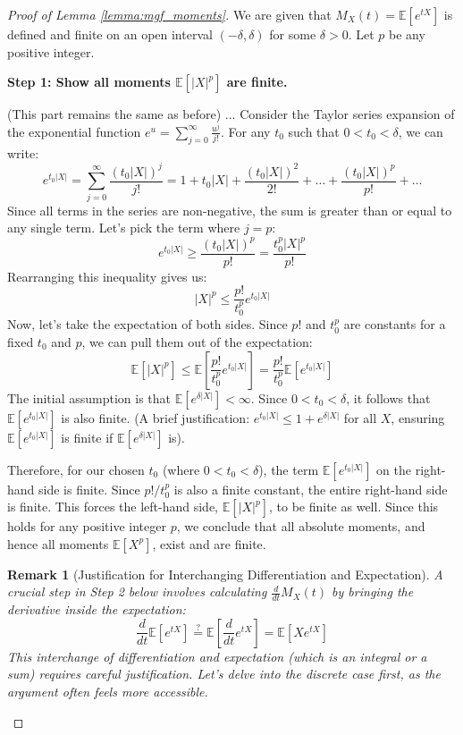 \documentclass[12pt]{article}
\newtheorem{remark}[theorem]{Remark}
\begin{document}
\begin{proof}[Proof of Lemma \ref{lemma:mgf_moments}]
We are given that $M_X(t) = \mathbb{E}[e^{tX}]$ is defined and finite on an open interval $(-\delta, \delta)$ for some $\delta > 0$. Let $p$ be any positive integer.

\textbf{Step 1: Show all moments $\mathbb{E}[|X|^p]$ are finite.}

(This part remains the same as before) ... Consider the Taylor series expansion of the exponential function $e^u = \sum_{j=0}^{\infty} \frac{u^j}{j!}$. For any $t_0$ such that $0 < t_0 < \delta$, we can write:
\[
e^{t_0|X|} = \sum_{j=0}^{\infty} \frac{(t_0|X|)^j}{j!} = 1 + t_0|X| + \frac{(t_0|X|)^2}{2!} + \dots + \frac{(t_0|X|)^p}{p!} + \dots
\]
Since all terms in the series are non-negative, the sum is greater than or equal to any single term. Let's pick the term where $j=p$:
\[
e^{t_0|X|} \ge \frac{(t_0|X|)^p}{p!} = \frac{t_0^p |X|^p}{p!}
\]
Rearranging this inequality gives us:
\[
|X|^p \le \frac{p!}{t_0^p} e^{t_0|X|}
\]
Now, let's take the expectation of both sides. Since $p!$ and $t_0^p$ are constants for a fixed $t_0$ and $p$, we can pull them out of the expectation:
\[
\mathbb{E}[|X|^p] \le \mathbb{E}\left[ \frac{p!}{t_0^p} e^{t_0|X|} \right] = \frac{p!}{t_0^p} \mathbb{E}[e^{t_0|X|}]
\]
The initial assumption is that $\mathbb{E}[e^{\delta|X|}] < \infty$. Since $0 < t_0 < \delta$, it follows that $\mathbb{E}[e^{t_0|X|}]$ is also finite. (A brief justification: $e^{t_0|X|} \le 1 + e^{\delta|X|}$ for all $X$, ensuring $\mathbb{E}[e^{t_0|X|}]$ is finite if $\mathbb{E}[e^{\delta|X|}]$ is).

Therefore, for our chosen $t_0$ (where $0 < t_0 < \delta$), the term $\mathbb{E}[e^{t_0|X|}]$ on the right-hand side is finite. Since $p!/t_0^p$ is also a finite constant, the entire right-hand side is finite. This forces the left-hand side, $\mathbb{E}[|X|^p]$, to be finite as well.
Since this holds for any positive integer $p$, we conclude that all absolute moments, and hence all moments $\mathbb{E}[X^p]$, exist and are finite.

\begin{remark}[Justification for Interchanging Differentiation and Expectation] \label{rem:interchange}
A crucial step in Step 2 below involves calculating $\frac{d}{dt} M_X(t)$ by bringing the derivative inside the expectation:
\[ \frac{d}{dt} \mathbb{E}[e^{tX}] \stackrel{?}{=} \mathbb{E}\left[ \frac{d}{dt} e^{tX} \right] = \mathbb{E}[X e^{tX}] \]
This interchange of differentiation and expectation (which is an integral or a sum) requires careful justification. Let's delve into the discrete case first, as the argument often feels more accessible.


\end{remark}
\end{proof}
\end{document}
